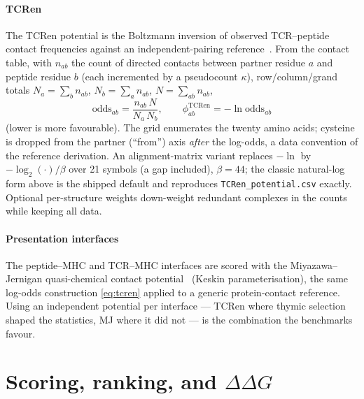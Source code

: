 \documentclass[11pt]{article}
\theoremstyle{oldplain}
\theoremstyle{oldrem}
\begin{document}
\paragraph{TCRen} The TCRen potential is the Boltzmann inversion of observed TCR--peptide contact
frequencies against an independent-pairing reference~\cite{Karnaukhov2024,Sippl1990}. From the contact
table, with $n_{ab}$ the count of directed contacts between partner residue $a$ and peptide residue $b$
(each incremented by a pseudocount $\kappa$), row/column/grand totals $N_a=\sum_b n_{ab}$,
$N_b=\sum_a n_{ab}$, $N=\sum_{ab}n_{ab}$,
\begin{equation}\label{eq:tcren}
  \mathrm{odds}_{ab}=\frac{n_{ab}\,N}{N_a\,N_b},
  \qquad
  \phi^{\mathrm{TCRen}}_{ab}=-\ln\mathrm{odds}_{ab}
\end{equation}
(lower is more favourable). The grid enumerates the twenty amino acids; cysteine is dropped from the
partner (``from'') axis \emph{after} the log-odds, a data convention of the reference derivation. An
alignment-matrix variant replaces $-\ln$ by $-\log_2(\cdot)/\beta$ over 21 symbols (a gap included),
$\beta=44$; the classic natural-log form above is the shipped default and reproduces
\texttt{TCRen\_potential.csv} exactly. Optional per-structure weights down-weight redundant complexes in
the counts while keeping all data.

\paragraph{Presentation interfaces} The peptide--MHC and TCR--MHC interfaces are scored with the
Miyazawa--Jernigan quasi-chemical contact potential~\cite{Miyazawa1996} (Keskin parameterisation), the
same log-odds construction \eqref{eq:tcren} applied to a generic protein-contact reference. Using an
independent potential per interface --- TCRen where thymic selection shaped the statistics, MJ where it
did not --- is the combination the benchmarks favour.

\section{Scoring, ranking, and \texorpdfstring{$\Delta\Delta G$}{ddG}}\label{sec:scoring}
\end{document}
